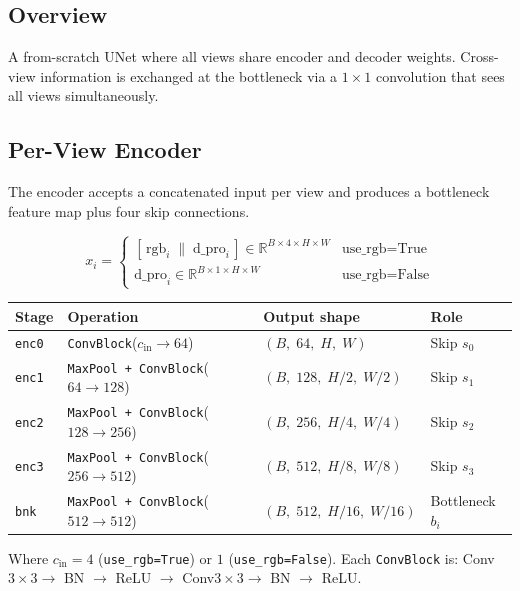 \documentclass[11pt]{article}
\begin{document}
\subsection{Overview}

A from-scratch UNet where all views share encoder and decoder weights.
Cross-view information is exchanged at the bottleneck via a $1\times1$
convolution that sees all views simultaneously.

\subsection{Per-View Encoder}

The encoder accepts a concatenated input per view and produces a bottleneck
feature map plus four skip connections.

\[
x_i =
\begin{cases}
[\,\text{rgb}_i \;\|\; \text{d\_pro}_i\,] \in \mathbb{R}^{B \times 4 \times H \times W} & \text{use\_rgb=True} \\
\text{d\_pro}_i \in \mathbb{R}^{B \times 1 \times H \times W} & \text{use\_rgb=False}
\end{cases}
\]

\begin{center}
\begin{tabular}{llll}
\toprule
\textbf{Stage} & \textbf{Operation} & \textbf{Output shape} & \textbf{Role} \\
\midrule
\texttt{enc0} & \texttt{ConvBlock}($c_\text{in} \to 64$)          & $(B,\;64,\;H,\;W)$        & Skip $s_0$ \\
\texttt{enc1} & \texttt{MaxPool + ConvBlock}($64 \to 128$)        & $(B,\;128,\;H/2,\;W/2)$   & Skip $s_1$ \\
\texttt{enc2} & \texttt{MaxPool + ConvBlock}($128 \to 256$)       & $(B,\;256,\;H/4,\;W/4)$   & Skip $s_2$ \\
\texttt{enc3} & \texttt{MaxPool + ConvBlock}($256 \to 512$)       & $(B,\;512,\;H/8,\;W/8)$   & Skip $s_3$ \\
\texttt{bnk}  & \texttt{MaxPool + ConvBlock}($512 \to 512$)       & $(B,\;512,\;H/16,\;W/16)$ & Bottleneck $b_i$ \\
\bottomrule
\end{tabular}
\end{center}

Where $c_\text{in} = 4$ (\texttt{use\_rgb=True}) or $1$ (\texttt{use\_rgb=False}).
Each \texttt{ConvBlock} is: Conv$3\times3 \to$ BN $\to$ ReLU $\to$ Conv$3\times3 \to$ BN $\to$ ReLU.
\end{document}
